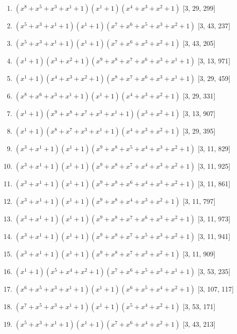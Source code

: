 \documentclass[10pt,twocolumn]{article}
\begin{document}
\begin{enumerate}
\item $(x^{8} + x^{5} + x^{3} + x^{1} + 1)(x^{1} + 1)(x^{4} + x^{3} + x^{2} + 1)$  [3, 29, 299]
\item $(x^{5} + x^{3} + x^{1} + 1)(x^{1} + 1)(x^{7} + x^{6} + x^{5} + x^{3} + x^{2} + 1)$  [3, 43, 237]
\item $(x^{5} + x^{3} + x^{1} + 1)(x^{1} + 1)(x^{7} + x^{6} + x^{3} + x^{2} + 1)$  [3, 43, 205]
\item $(x^{1} + 1)(x^{3} + x^{2} + 1)(x^{9} + x^{8} + x^{7} + x^{6} + x^{3} + x^{1} + 1)$  [3, 13, 971]
\item $(x^{1} + 1)(x^{4} + x^{3} + x^{2} + 1)(x^{8} + x^{7} + x^{6} + x^{3} + x^{1} + 1)$  [3, 29, 459]
\item $(x^{8} + x^{6} + x^{3} + x^{1} + 1)(x^{1} + 1)(x^{4} + x^{3} + x^{2} + 1)$  [3, 29, 331]
\item $(x^{1} + 1)(x^{9} + x^{8} + x^{7} + x^{3} + x^{1} + 1)(x^{3} + x^{2} + 1)$  [3, 13, 907]
\item $(x^{1} + 1)(x^{8} + x^{7} + x^{3} + x^{1} + 1)(x^{4} + x^{3} + x^{2} + 1)$  [3, 29, 395]
\item $(x^{3} + x^{1} + 1)(x^{1} + 1)(x^{9} + x^{8} + x^{5} + x^{4} + x^{3} + x^{2} + 1)$  [3, 11, 829]
\item $(x^{3} + x^{1} + 1)(x^{1} + 1)(x^{9} + x^{8} + x^{7} + x^{4} + x^{3} + x^{2} + 1)$  [3, 11, 925]
\item $(x^{3} + x^{1} + 1)(x^{1} + 1)(x^{9} + x^{8} + x^{6} + x^{4} + x^{3} + x^{2} + 1)$  [3, 11, 861]
\item $(x^{3} + x^{1} + 1)(x^{1} + 1)(x^{9} + x^{8} + x^{4} + x^{3} + x^{2} + 1)$  [3, 11, 797]
\item $(x^{3} + x^{1} + 1)(x^{1} + 1)(x^{9} + x^{8} + x^{7} + x^{6} + x^{3} + x^{2} + 1)$  [3, 11, 973]
\item $(x^{3} + x^{1} + 1)(x^{1} + 1)(x^{9} + x^{8} + x^{7} + x^{5} + x^{3} + x^{2} + 1)$  [3, 11, 941]
\item $(x^{3} + x^{1} + 1)(x^{1} + 1)(x^{9} + x^{8} + x^{7} + x^{3} + x^{2} + 1)$  [3, 11, 909]
\item $(x^{1} + 1)(x^{5} + x^{4} + x^{2} + 1)(x^{7} + x^{6} + x^{5} + x^{3} + x^{1} + 1)$  [3, 53, 235]
\item $(x^{6} + x^{5} + x^{3} + x^{1} + 1)(x^{1} + 1)(x^{6} + x^{5} + x^{4} + x^{2} + 1)$  [3, 107, 117]
\item $(x^{7} + x^{5} + x^{3} + x^{1} + 1)(x^{1} + 1)(x^{5} + x^{4} + x^{2} + 1)$  [3, 53, 171]
\item $(x^{5} + x^{3} + x^{1} + 1)(x^{1} + 1)(x^{7} + x^{6} + x^{4} + x^{2} + 1)$  [3, 43, 213]

\end{enumerate}
\end{document}
